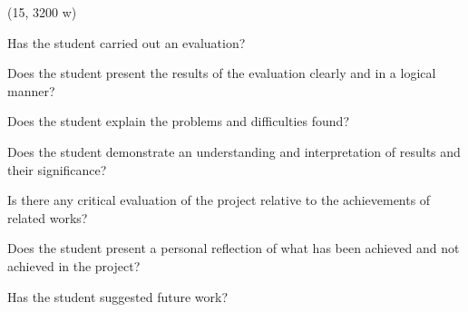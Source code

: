 (15, 3200 w)

Has the student carried out an evaluation?

Does the student present the results of the evaluation clearly and in a logical
manner?

Does the student explain the problems and difficulties found?

Does the student demonstrate an understanding and interpretation of results and
their significance?

Is there any critical evaluation of the project relative to the achievements of
related works?

Does the student present a personal reflection of what has been achieved and
not achieved in the project?

Has the student suggested future work?
